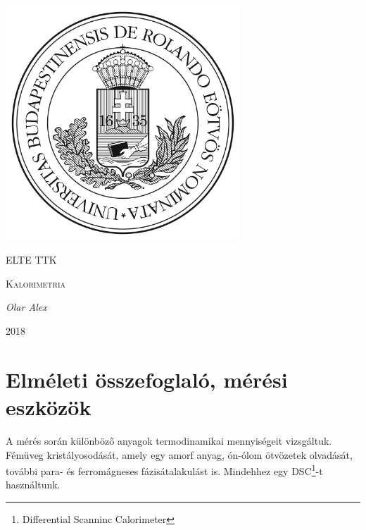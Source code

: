 \documentclass[a4paper,12pt]{article}
\begin{document}
\linespread{1.25}

\begin{titlepage}

	\centering
	\includegraphics[width=0.66\textwidth]{elte.jpg}\par\vspace{1cm}
	{\scshape\LARGE ELTE TTK \par}
	\vspace{3cm}
	{\scshape\Large Kalorimetria \par}
	\vspace{1cm}
	{\large\itshape Olar Alex\par}
	\vspace{3cm}
	{\large 2018 \par}
	
\end{titlepage}

\tableofcontents

\newpage

\section{Elméleti összefoglaló, mérési eszközök}

\vspace{5mm}

\par A mérés során különböző anyagok termodinamikai mennyiségeit vizsgáltuk. Fémüveg kristályosodását, amely egy amorf anyag, ón-ólom ötvözetek olvadását, további para- és ferromágneses fázisátalakulást is. Mindehhez egy DSC\footnote{Differential Scanninc Calorimeter}-t használtunk.

\vspace{5mm}
\end{document}
